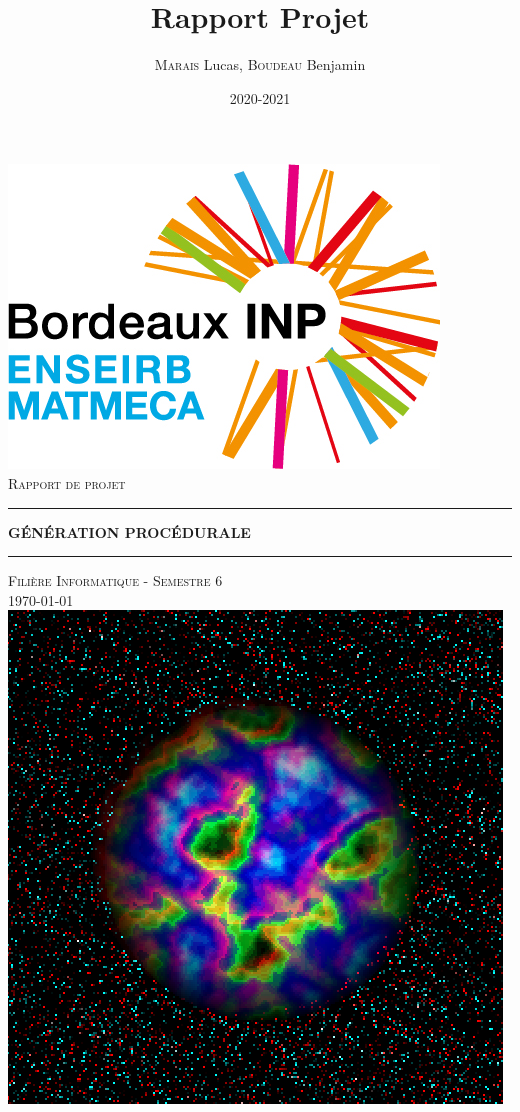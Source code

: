 \documentclass[11pt]{article}
\title{Rapport Projet}
\author{\textsc{Marais} Lucas, \textsc{Boudeau} Benjamin}
\date{2020-2021}
\begin{document}
\begin{titlepage}
\centering
\includegraphics[scale=0.3]{enseirb.png}
\\
\vspace*{1\baselineskip}
\LARGE{\textsc{Rapport de projet}}
\vspace*{0.8\baselineskip}
\rule{1\linewidth}{1pt}

\huge{\textbf{G\'EN\'ERATION PROC\'EDURALE}}
\vspace*{1\baselineskip}
\rule{1\linewidth}{1pt}
\vspace*{1\baselineskip}
\LARGE{\textsc{Filière Informatique - Semestre 6}}
\\

\large{\today}
\vspace*{3\baselineskip}
\\
\centering
\includegraphics[scale=0.7]{planet.png}
\\
\vspace*{4\baselineskip}


\end{titlepage}
\end{document}
